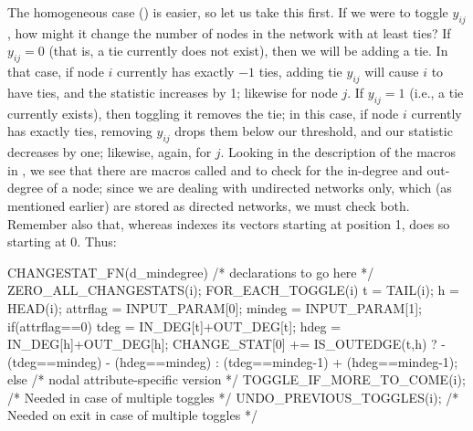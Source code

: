 \documentclass[nojss]{jss}
\begin{document}
The homogeneous case () is easier, so let us take this first.
If we were to toggle $y_{ij}$, how might it change the number of nodes in the
network with at least  ties? If $y_{ij}=0$ (that is, a tie
currently does not exist), then we will be adding a tie. In that case, if node
$i$ currently has exactly $-1$ ties, adding tie $y_{ij}$ will cause
$i$ to have  ties, and the statistic increases by 1; likewise for
node $j$. If $y_{ij}=1$ (i.e., a tie currently exists), then toggling it removes
the tie; in this case, if node $i$ currently has exactly  ties,
removing $y_{ij}$ drops them below our threshold, and our statistic decreases by
one; likewise, again, for $j$. Looking in the description of the macros in
, we see that there are macros called  and
 to check for the in-degree and out-degree of a node; since we are
dealing with undirected networks only, which (as mentioned earlier) are stored
as directed networks, we must check both. Remember also that, whereas
 indexes its vectors starting at position 1,  does so
starting at 0. Thus:
\begin{CodeChunk}
\begin{CodeInput}
CHANGESTAT_FN(d_mindegree) {
  /* declarations to go here */
  ZERO_ALL_CHANGESTATS(i);
  FOR_EACH_TOGGLE(i) {
    t = TAIL(i); h = HEAD(i);
    attrflag = INPUT_PARAM[0];
    mindeg = INPUT_PARAM[1];
    if(attrflag==0){
      tdeg = IN_DEG[t]+OUT_DEG[t];
      hdeg = IN_DEG[h]+OUT_DEG[h];
      CHANGE_STAT[0] += IS_OUTEDGE(t,h) ?
        - (tdeg==mindeg) - (hdeg==mindeg) :
        (tdeg==mindeg-1) + (hdeg==mindeg-1);
    }else{
      /* nodal attribute-specific version */
    }
    TOGGLE_IF_MORE_TO_COME(i); /* Needed in case of multiple toggles */
  }
  UNDO_PREVIOUS_TOGGLES(i); /* Needed on exit in case of multiple toggles */
}
\end{CodeInput}
\end{CodeChunk}
\end{document}
